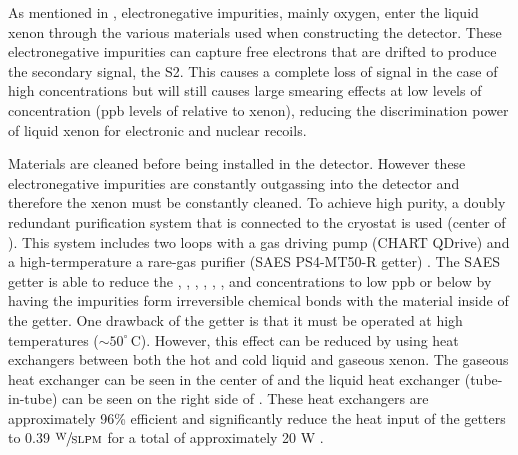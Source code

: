  As mentioned in , electronegative impurities, mainly oxygen, enter the liquid xenon through the various materials used when constructing the detector.  These electronegative impurities can capture free electrons that are drifted to produce the secondary signal, the S2.  This causes a complete loss of signal in the case of high concentrations but will still causes large smearing effects at low levels of concentration (ppb levels of  relative to xenon), reducing the discrimination power of liquid xenon for electronic and nuclear recoils.
 
Materials are cleaned before being installed in the detector.  However these electronegative impurities are constantly outgassing into the detector and therefore the xenon must be constantly cleaned.  To achieve high purity, a doubly redundant purification system that is connected to the cryostat is used (center of ).  This system includes two loops with a gas driving pump (CHART QDrive) and a high-termperature a rare-gas purifier (SAES PS4-MT50-R getter) \cite{aprile2017xenon1t}.  The SAES getter is able to reduce the , , , , , , and  concentrations to low ppb or below by having the impurities form irreversible chemical bonds with the material inside of the getter.  One drawback of the getter is that it must be operated at high temperatures ($\sim 50^{\circ} \, \textrm{C}$).  However, this effect can be reduced by using heat exchangers between both the hot and cold liquid and gaseous xenon.  The gaseous heat exchanger can be seen in the center of   and the liquid heat exchanger (tube-in-tube) can be seen on the right side of .  These heat exchangers are approximately 96\% efficient and significantly reduce the heat input of the getters to 0.39 $\sfrac{\textrm{W}}{\textrm{SLPM}}$ for a total of approximately 20 W \cite{aprile2017xenon1t}.

 
 
 \subsubsection{}
  \label{sec:xe1t_pur_kr85}
 
